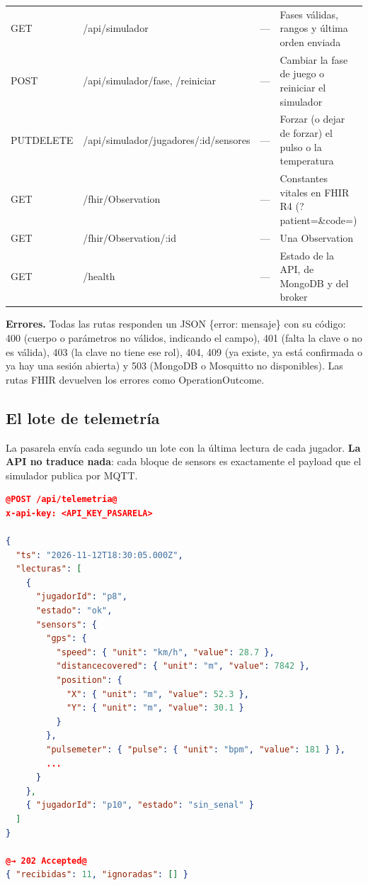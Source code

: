 \documentclass[runningheads]{llncs}
\begin{document}
\begin{table}[!ht]
\begin{tabularx}{\textwidth}{>{\raggedright\arraybackslash}p{1.3cm}>{\raggedright\arraybackslash}p{4.5cm}>{\raggedright\arraybackslash}p{1.15cm}L}
GET & /api/simulador & — & Fases válidas, rangos y última orden enviada \\
POST & /api/simulador/fase, /reiniciar & — & Cambiar la fase de juego o reiniciar el simulador \\
PUT\newline DELETE & /api/simulador/jugadores/:id/sensores & — & Forzar (o dejar de forzar) el pulso o la temperatura \\
GET & /fhir/Observation & — & Constantes vitales en FHIR R4 (?patient=\&code=) \\
GET & /fhir/Observation/:id & — & Una Observation \\
GET & /health & — & Estado de la API, de MongoDB y del broker \\
\bottomrule
\end{tabularx}
\end{table}

\textbf{Errores.} Todas las rutas responden un JSON \{error: mensaje\} con su código: 400 (cuerpo o parámetros no válidos, indicando el campo), 401 (falta la clave o no es válida), 403 (la clave no tiene ese rol), 404, 409 (ya existe, ya está confirmada o ya hay una sesión abierta) y 503 (MongoDB o Mosquitto no disponibles). Las rutas FHIR devuelven los errores como OperationOutcome.

\subsection{El lote de telemetría}

La pasarela envía cada segundo un lote con la última lectura de cada jugador. \textbf{La API no traduce nada}: cada bloque de sensors es exactamente el payload que el simulador publica por MQTT.

\begin{lstlisting}[language=json,moredelim={[is][\color{clave}\bfseries]{@}{@}}]
@POST /api/telemetria@
x-api-key: <API_KEY_PASARELA>

{
  "ts": "2026-11-12T18:30:05.000Z",
  "lecturas": [
    {
      "jugadorId": "p8",
      "estado": "ok",
      "sensors": {
        "gps": {
          "speed": { "unit": "km/h", "value": 28.7 },
          "distancecovered": { "unit": "m", "value": 7842 },
          "position": {
            "X": { "unit": "m", "value": 52.3 },
            "Y": { "unit": "m", "value": 30.1 }
          }
        },
        "pulsemeter": { "pulse": { "unit": "bpm", "value": 181 } },
        ...
      }
    },
    { "jugadorId": "p10", "estado": "sin_senal" }
  ]
}

@→ 202 Accepted@
{ "recibidas": 11, "ignoradas": [] }
\end{lstlisting}
\end{document}
